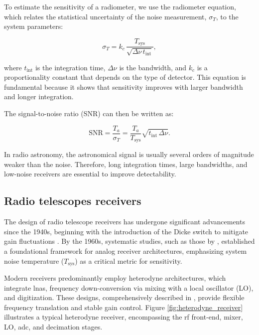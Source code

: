 To estimate the sensitivity of a radiometer, we use the radiometer equation, which relates the statistical uncertainty of the noise measurement, $\sigma_T$, to the system parameters:  

\begin{equation}
    \sigma_T = k_c \, \frac{T_\text{sys}}{\sqrt{\Delta \nu \, t_\text{int}}},
\end{equation}

where $t_\text{int}$ is the integration time, $\Delta \nu$ is the bandwidth, and $k_c$ is a proportionality constant that depends on the type of detector. This equation is fundamental because it shows that sensitivity improves with larger bandwidth and longer integration.  

The signal-to-noise ratio (SNR) can then be written as:  

\begin{equation}
    \text{SNR} = \frac{T_a}{\sigma_T} = \frac{T_a}{T_\text{sys}} \sqrt{t_\text{int} \, \Delta \nu}.
\end{equation}

In radio astronomy, the astronomical signal is usually several orders of magnitude weaker than the noise. Therefore, long integration times, large bandwidths, and low-noise receivers are essential to improve detectability.

\subsection{Radio telescopes receivers}
The design of radio telescope receivers has undergone significant advancements since the 1940s, beginning with the introduction of the Dicke switch to mitigate gain fluctuations \citep{dicke1946}. By the 1960s, systematic studies, such as those by \citet{tiuri1964}, established a foundational framework for analog receiver architectures, emphasizing system noise temperature ($T_{\text{sys}}$) as a critical metric for sensitivity. 

Modern receivers predominantly employ heterodyne architectures, which integrate \glspl{lna}, frequency down-conversion via mixing with a local oscillator (LO), and digitization. These designs, comprehensively described in \citet{Wilson2013_theory,Wilson2013_practical}, provide flexible frequency translation and stable gain control. Figure \ref{fig:heterodyne_receiver} illustrates a typical heterodyne receiver, encompassing the \gls{rf} front-end, mixer, LO, \gls{adc}, and decimation stages.

